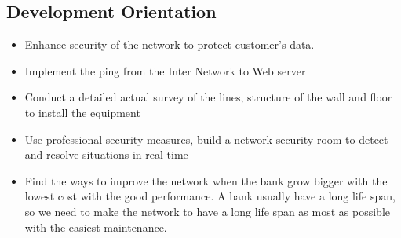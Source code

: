 \subsection{Development Orientation}
\begin{itemize}
    \item Enhance security of the network to protect customer's data.
    \item Implement the ping from the Inter Network to Web server
    \item Conduct a detailed actual survey of the lines, structure of the wall and floor to
install the equipment
\item Use professional security measures, build a network security room to detect and
resolve situations in real time
\item Find the ways to improve the network when the bank grow bigger with the lowest cost with the good performance. A bank usually have a long life span, so we need to make the network to have a long life span as most as possible with the easiest maintenance.
\end{itemize}
